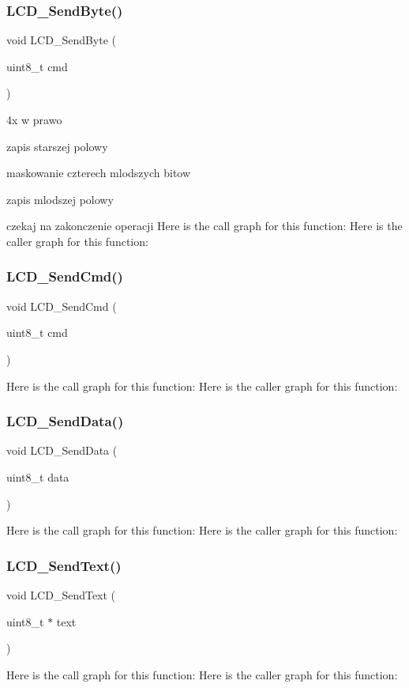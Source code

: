 \subsubsection{L\+C\+D\+\_\+\+Send\+Byte()}
{\footnotesize\ttfamily void L\+C\+D\+\_\+\+Send\+Byte (\begin{DoxyParamCaption}\item[{uint8\+\_\+t}]{cmd }\end{DoxyParamCaption})}

4x w prawo

zapis starszej polowy

maskowanie czterech mlodszych bitow

zapis mlodszej polowy

czekaj na zakonczenie operacji Here is the call graph for this function\+:
Here is the caller graph for this function\+:
\mbox{\label{lcd4bit_8h_a6fe412af8613c79d0e88b03b012265dc}} 
\subsubsection{L\+C\+D\+\_\+\+Send\+Cmd()}
{\footnotesize\ttfamily void L\+C\+D\+\_\+\+Send\+Cmd (\begin{DoxyParamCaption}\item[{uint8\+\_\+t}]{cmd }\end{DoxyParamCaption})}

Here is the call graph for this function\+:
Here is the caller graph for this function\+:
\mbox{\label{lcd4bit_8h_aa09da605411449b125a3734940ca8f41}} 
\subsubsection{L\+C\+D\+\_\+\+Send\+Data()}
{\footnotesize\ttfamily void L\+C\+D\+\_\+\+Send\+Data (\begin{DoxyParamCaption}\item[{uint8\+\_\+t}]{data }\end{DoxyParamCaption})}

Here is the call graph for this function\+:
Here is the caller graph for this function\+:
\mbox{\label{lcd4bit_8h_ad0c262e2f73ff4d8d2fd198f76e102a8}} 
\subsubsection{L\+C\+D\+\_\+\+Send\+Text()}
{\footnotesize\ttfamily void L\+C\+D\+\_\+\+Send\+Text (\begin{DoxyParamCaption}\item[{uint8\+\_\+t $\ast$}]{text }\end{DoxyParamCaption})}

Here is the call graph for this function\+:
Here is the caller graph for this function\+:
